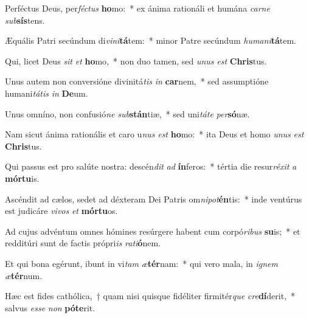 \item Perféctus Deus, per\textit{féc}\textit{tus} \textbf{ho}mo:~* ex ánima rationáli et humána \textit{car}\textit{ne} \textit{sub}\textbf{sís}tens.
\item Æquális Patri secúndum di\textit{vi}\textit{ni}\textbf{tá}tem:~* minor Patre secúndum \textit{hu}\textit{ma}\textit{ni}\textbf{tá}tem.
\item Qui, licet Deus \textit{sit} \textit{et} \textbf{ho}mo,~* non duo tamen, sed \textit{u}\textit{nus} \textit{est} \textbf{Chris}tus.
\item Unus autem non conversióne divinitá\textit{tis} \textit{in} \textbf{car}nem,~* sed assumptióne humani\textit{tá}\textit{tis} \textit{in} \textbf{De}um.
\item Unus omníno, non confusió\textit{ne} \textit{sub}\textbf{stán}tiæ,~* sed uni\textit{tá}\textit{te} \textit{per}\textbf{só}næ.
\item Nam sicut ánima rationális et caro u\textit{nus} \textit{est} \textbf{ho}mo:~* ita Deus et homo \textit{u}\textit{nus} \textit{est} \textbf{Chris}tus.
\item Qui passus est pro salúte nostra: descén\textit{dit} \textit{ad} \textbf{ín}feros:~* tértia die resur\textit{ré}\textit{xit} \textit{a} \textbf{mór}\textbf{tu}is.
\item Ascéndit ad cælos, sedet ad déxteram Dei Patris om\textit{ni}\textit{pot}\textbf{én}tis:~* inde ventúrus est judicáre \textit{vi}\textit{vos} \textit{et} \textbf{mór}\textbf{tu}os.
\item Ad cujus advéntum omnes hómines resúrgere habent cum corpó\textit{ri}\textit{bus} \textbf{su}is;~* et redditúri sunt de factis própri\textit{is} \textit{ra}\textit{ti}\textbf{ó}nem.
\item Et qui bona egérunt, ibunt in vi\textit{tam} \textit{æ}\textbf{tér}nam:~* qui vero mala, in \textit{i}\textit{gnem} \textit{æ}\textbf{tér}num.
\item Hæc est fides cathólica,~† quam nisi quisque fidéliter firmitér\textit{que} \textit{cre}\textbf{dí}derit,~* salvus \textit{es}\textit{se} \textit{non} \textbf{pót}\textbf{e}rit.
